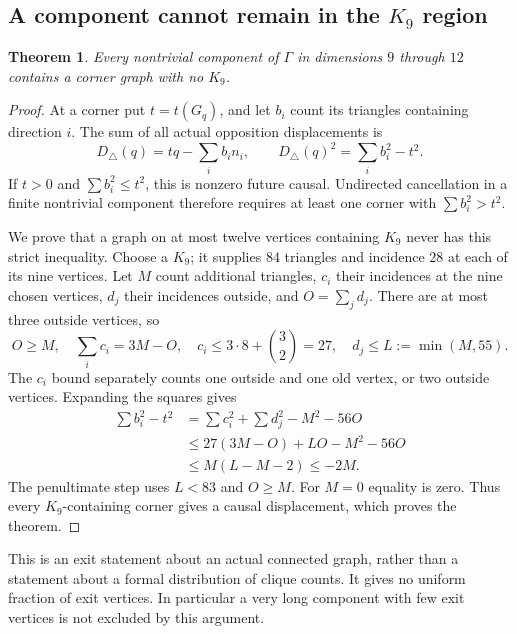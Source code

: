 \documentclass[11pt]{article}
\newtheorem{theorem}{Theorem}[section]
\theoremstyle{definition}\newtheorem{definition}[theorem]{Definition}
\theoremstyle{remark}\newtheorem{remark}[theorem]{Remark}
\newcommand{\bin}[2]{\binom{#1}{#2}}
\begin{document}
\subsection{A component cannot remain in the \(K_9\) region}
\begin{theorem}\label{thm:exit}
Every nontrivial component of \(\Gamma\) in dimensions \(9\) through
\(12\) contains a corner graph with no \(K_9\).
\end{theorem}
\begin{proof}
At a corner put \(t=t(G_q)\), and let \(b_i\) count its triangles
containing direction \(i\). The sum of all actual opposition
displacements is
\begin{equation}\label{eq:triD}
 D_\triangle(q)=tq-\sum_i b_i n_i,\qquad
 D_\triangle(q)^2=\sum_i b_i^2-t^2.
\end{equation}
If \(t>0\) and \(\sum b_i^2\le t^2\), this is nonzero future
causal. Undirected cancellation in a finite nontrivial component
therefore requires at least one corner with \(\sum b_i^2>t^2\).

We prove that a graph on at most twelve vertices containing \(K_9\)
never has this strict inequality. Choose a \(K_9\); it supplies
\(84\) triangles and incidence \(28\) at each of its nine vertices.
Let \(M\) count additional triangles, \(c_i\) their incidences at
the nine chosen vertices, \(d_j\) their incidences outside, and
\(O=\sum_jd_j\). There are at most three outside vertices, so
\[
 O\ge M,\quad \sum_i c_i=3M-O,\quad
 c_i\le3\cdot8+\bin32=27,\quad
 d_j\le L:=\min(M,55).
\]
The \(c_i\) bound separately counts one outside and one old vertex,
or two outside vertices. Expanding the squares gives
\begin{align*}
 \sum b_i^2-t^2
 &=\sum c_i^2+\sum d_j^2-M^2-56O\\
 &\le27(3M-O)+LO-M^2-56O\\
 &\le M(L-M-2)\le-2M.
\end{align*}
The penultimate step uses \(L<83\) and \(O\ge M\).
For \(M=0\) equality is zero. Thus every \(K_9\)-containing
corner gives a causal displacement, which proves the theorem.
\end{proof}

This is an exit statement about an actual connected graph, rather than
a statement about a formal distribution of clique counts. It gives no
uniform fraction of exit vertices. In particular a very long component
with few exit vertices is not excluded by this argument.
\end{document}
